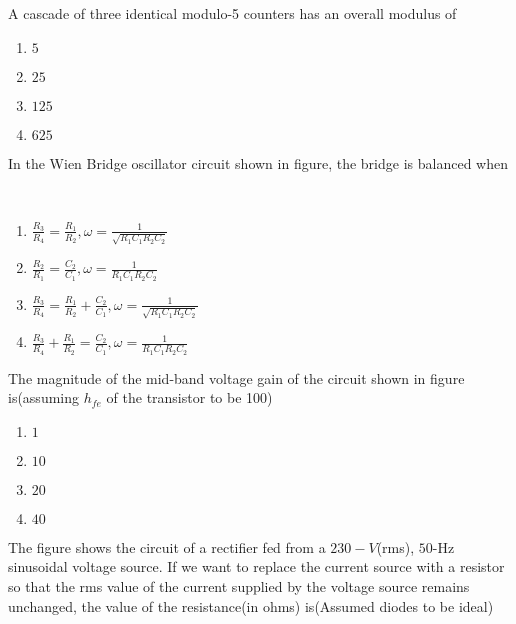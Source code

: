     \item A cascade of three identical modulo-5 counters has an overall modulus of 
    \begin{enumerate}
        \item $5$
        \item $25$
        \item $125$
        \item $625$
    \end{enumerate}
    \item In the Wien Bridge oscillator circuit shown in figure, the bridge is balanced when\\ 
\\   
    \begin{enumerate}
        \item $\displaystyle \frac{R_3}{R_4}=\frac{R_1}{R_2}, \omega=\frac{1}{\sqrt{R_1C_1R_2C_2}}$
        \item $\displaystyle \frac{R_2}{R_1}=\frac{C_2}{C_1}, \omega=\frac{1}{R_1C_1R_2C_2}$
        \item $\displaystyle \frac{R_3}{R_4}=\frac{R_1}{R_2}+\frac{C_2}{C_1}, \omega=\frac{1}{\sqrt{R_1C_1R_2C_2}}$
        \item $\displaystyle \frac{R_3}{R_4}+\frac{R_1}{R_2}=\frac{C_2}{C_1}, \omega=\frac{1}{R_1C_1R_2C_2}$
    \end{enumerate} 
    \item The magnitude of the mid-band voltage gain of the circuit shown in figure is(assuming $h_{fe}$ of the transistor to be 100)
    \begin{enumerate}
        \item $1$
        \item $10$
        \item $20$
        \item $40$
    \end{enumerate}
    \item The figure shows the circuit of a rectifier fed from a $230-V$(rms), $50$-Hz sinusoidal voltage source. If we want to replace the current source with a resistor so that the rms value of the current supplied by the voltage source remains unchanged, the value of the resistance(in ohms) is(Assumed diodes to be ideal)\\
